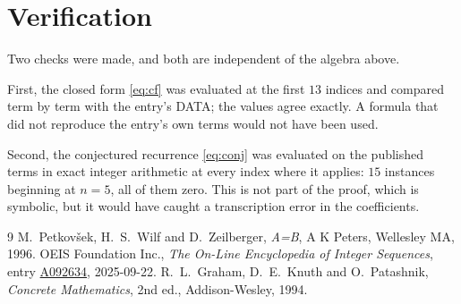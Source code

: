 \documentclass[11pt,a4paper]{article}
\theoremstyle{plain}
\theoremstyle{definition}
\begin{document}
\section{Verification}

Two checks were made, and both are independent of the algebra above.

First, the closed form \eqref{eq:cf} was evaluated at the first $13$ indices and
compared term by term with the entry's DATA; the values agree exactly. A formula that did
not reproduce the entry's own terms would not have been used.

Second, the conjectured recurrence \eqref{eq:conj} was evaluated on the published terms in
exact integer arithmetic at every index where it applies: $15$ instances beginning at
$n=5$, all of them zero. This is not part of the proof, which is symbolic, but it
would have caught a transcription error in the coefficients.

\begin{thebibliography}{9}
 M.~Petkov\v{s}ek, H.~S.~Wilf and D.~Zeilberger, \emph{A=B}, A K Peters,
Wellesley MA, 1996.
 OEIS Foundation Inc., \emph{The On-Line Encyclopedia of Integer Sequences},
entry \href{https://oeis.org/A092634}{A092634}, 2025-09-22.
 R.~L.~Graham, D.~E.~Knuth and O.~Patashnik, \emph{Concrete Mathematics},
2nd ed., Addison-Wesley, 1994.
\end{thebibliography}
\end{document}
